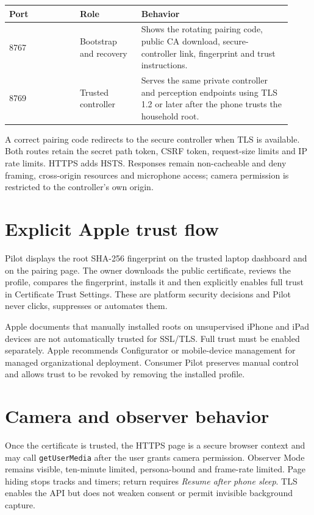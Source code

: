 \documentclass[11pt,a4paper]{article}
\begin{document}
\begin{longtable}{p{0.23\linewidth}p{0.20\linewidth}p{0.49\linewidth}}
\toprule
\textbf{Port} & \textbf{Role} & \textbf{Behavior} \\
\midrule
\endhead
8767 & Bootstrap and recovery & Shows the rotating pairing code, public CA
download, secure-controller link, fingerprint and trust instructions. \\
8769 & Trusted controller & Serves the same private controller and perception
endpoints using TLS 1.2 or later after the phone trusts the household root. \\
\bottomrule
\end{longtable}

A correct pairing code redirects to the secure controller when TLS is available.
Both routes retain the secret path token, CSRF token, request-size limits and IP
rate limits.  HTTPS adds HSTS.  Responses remain non-cacheable and deny framing,
cross-origin resources and microphone access; camera permission is restricted to
the controller's own origin.

\section{Explicit Apple trust flow}

Pilot displays the root SHA-256 fingerprint on the trusted laptop dashboard and
on the pairing page.  The owner downloads the public certificate, reviews the
profile, compares the fingerprint, installs it and then explicitly enables full
trust in Certificate Trust Settings.  These are platform security decisions and
Pilot never clicks, suppresses or automates them.

Apple documents that manually installed roots on unsupervised iPhone and iPad
devices are not automatically trusted for SSL/TLS.  Full trust must be enabled
separately.  Apple recommends Configurator or mobile-device management for managed
organizational deployment.  Consumer Pilot preserves manual control and allows
trust to be revoked by removing the installed profile.

\section{Camera and observer behavior}

Once the certificate is trusted, the HTTPS page is a secure browser context and
may call \texttt{get\allowbreak User\allowbreak Media} after the user grants camera permission.  Observer
Mode remains visible, ten-minute limited, persona-bound and frame-rate limited.
Page hiding stops tracks and timers; return requires \emph{Resume after phone
sleep}.  TLS enables the API but does not weaken consent or permit invisible
background capture.
\end{document}
